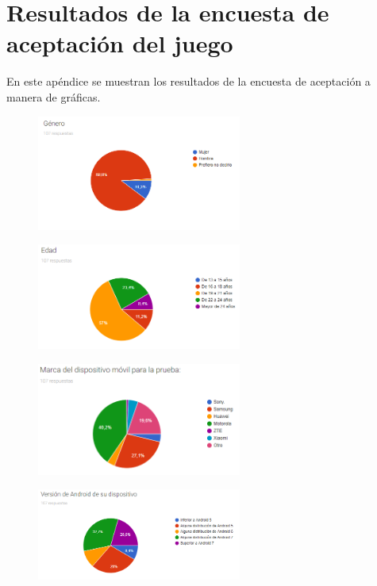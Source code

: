\chapter{Resultados de la encuesta de aceptación del juego} \label{Anexo:resultados}
En este apéndice se muestran los resultados de la encuesta de aceptación a 
manera de gráficas.

\begin{figure}[H]
    \centering
    \includegraphics[width=0.6\textwidth]{Anexos/respuestas/grafica01.png}
\end{figure}

\begin{figure}[H]
    \centering
    \includegraphics[width=0.6\textwidth]{Anexos/respuestas/grafica02.png}
\end{figure}

\begin{figure}[H]
    \centering
    \includegraphics[width=0.6\textwidth]{Anexos/respuestas/grafica03.png}
\end{figure}

\begin{figure}[H]
    \centering
    \includegraphics[width=0.6\textwidth]{Anexos/respuestas/grafica04.png}
\end{figure}

